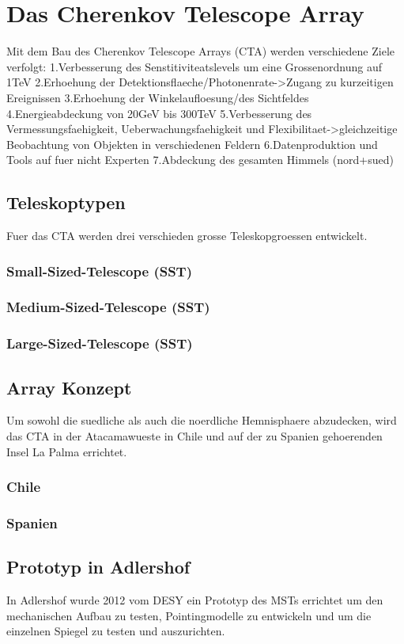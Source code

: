 \chapter{Das Cherenkov Telescope Array}
Mit dem Bau des Cherenkov Telescope Arrays (CTA) werden verschiedene Ziele verfolgt:
1.Verbesserung des Senstitiviteatslevels um eine Grossenordnung auf 1TeV
2.Erhoehung der Detektionsflaeche/Photonenrate->Zugang zu kurzeitigen Ereignissen
3.Erhoehung der Winkelaufloesung/des Sichtfeldes
4.Energieabdeckung von 20GeV bis 300TeV
5.Verbesserung des Vermessungsfaehigkeit, Ueberwachungsfaehigkeit und Flexibilitaet->gleichzeitige Beobachtung von Objekten in verschiedenen Feldern
6.Datenproduktion und Tools auf fuer nicht Experten
7.Abdeckung des gesamten Himmels (nord+sued)


\section{Teleskoptypen}
Fuer das CTA werden drei verschieden grosse Teleskopgroessen entwickelt.
\subsection{Small-Sized-Telescope (SST)}
\subsection{Medium-Sized-Telescope (SST)}
\subsection{Large-Sized-Telescope (SST)}

\section{Array Konzept}
Um sowohl die suedliche als auch die noerdliche Hemnisphaere abzudecken, wird das CTA in der Atacamawueste in Chile und auf der zu Spanien gehoerenden Insel La Palma errichtet.
\subsection{Chile}
\subsection{Spanien}

\section{Prototyp in Adlershof}
In Adlershof wurde 2012 vom DESY ein Prototyp des MSTs errichtet um den mechanischen Aufbau zu testen, Pointingmodelle zu entwickeln und um die einzelnen Spiegel zu testen und auszurichten.
